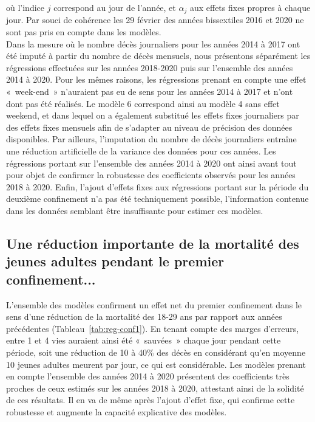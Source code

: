 \documentclass[titlepage]{article}
\begin{document}
où l'indice $j$ correspond au jour de l'année, et $\alpha_j$ aux effets fixes propres à chaque jour. Par souci de cohérence les 29 février des années bissextiles 2016 et 2020 ne sont pas pris en compte dans les modèles. \\

Dans la mesure où le nombre décès journaliers pour les années 2014 à 2017 ont été imputé à partir du nombre de décès mensuels, nous présentons séparément les régressions effectuées sur les années 2018-2020 puis sur l'ensemble des années 2014 à 2020. Pour les mêmes raisons, les régressions prenant en compte une effet « week-end » n'auraient pas eu de sens pour les années 2014 à 2017 et n'ont dont pas été réalisés. Le modèle 6 correspond ainsi au modèle 4 sans effet weekend, et dans lequel on a également substitué les effets fixes journaliers par des effets fixes mensuels afin de s'adapter au niveau de précision des données disponibles. Par ailleurs, l'imputation du nombre de décès journaliers entraîne une réduction artificielle de la variance des données pour ces années. Les régressions portant sur l'ensemble des années 2014 à 2020 ont ainsi avant tout pour objet de confirmer la robustesse des coefficients observés pour les années 2018 à 2020. Enfin, l'ajout d'effets fixes aux régressions portant sur la période du deuxième confinement n'a pas été techniquement possible, l'information contenue dans les données semblant être insuffisante pour estimer ces modèles.


\subsection*{Une réduction importante de la mortalité des jeunes adultes pendant le premier confinement...}

  L'ensemble des modèles confirment un effet net du premier confinement dans le sens d'une réduction de la mortalité des 18-29 ans par rapport aux années précédentes (Tableau \ref{tab:reg-conf1}). En tenant compte des marges d'erreurs, entre 1 et 4 vies auraient ainsi été « sauvées » chaque jour pendant cette période, soit une réduction de 10 à 40\% des décès en considérant qu'en moyenne 10 jeunes adultes meurent par jour, ce qui est considérable.  Les modèles prenant en compte l'ensemble des années 2014 à 2020  présentent des coefficients très proches de ceux estimés sur les années 2018 à 2020, attestant ainsi de la solidité de ces résultats. Il en va de même après l'ajout d'effet fixe, qui confirme cette robustesse et augmente la capacité explicative des modèles. \\
  
\end{document}
